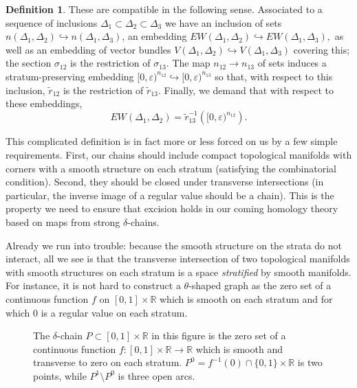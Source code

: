 \documentclass[10pt,a4paper]{amsart}
\theoremstyle{definition}
\newtheorem{definition}[theorem]{Definition}
\theoremstyle{remark}
\numberwithin{figure}{qchap}
\begin{document}
\begin{definition}
These are compatible in the following sense. Associated to a sequence of inclusions $\Delta_1 \subset \Delta_2 \subset \Delta_3$ we have an inclusion of sets $n(\Delta_1, \Delta_2) \hookrightarrow n(\Delta_1, \Delta_3)$, an embedding $EW(\Delta_1, \Delta_2) \hookrightarrow EW(\Delta_1, \Delta_3),$ as well as an embedding of vector bundles $V(\Delta_1, \Delta_2) \hookrightarrow V(\Delta_1, \Delta_3)$ covering this; the section $\sigma_{12}$ is the restriction of $\sigma_{13}$. The map $n_{12} \to n_{13}$ of sets induces a stratum-preserving embedding $[0,\varepsilon)^{n_{12}} \hookrightarrow [0,\varepsilon)^{n_{13}}$ so that, with respect to this inclusion, $\tilde r_{12}$ is the restriction of $\tilde r_{13}$. Finally, we demand that with respect to these embeddings, $$EW(\Delta_1, \Delta_2) = \tilde r_{13}^{-1}\left([0,\varepsilon)^{n_{12}}\right).$$
\end{definition}

This complicated definition is in fact more or less forced on us by a few simple requirements. First, our chains should include compact topological manifolds with corners with a smooth structure on each stratum (satisfying the combinatorial condition). Second, they should be closed under transverse intersections (in particular, the inverse image of a regular value should be a chain). This is the property we need to ensure that excision holds in our coming homology theory based on maps from strong $\delta$-chains.

Already we run into trouble: because the smooth structure on the strata do not interact, all we see is that the transverse intersection of two topological manifolds with smooth structures on each stratum is a space \textit{stratified} by smooth manifolds. For instance, it is not hard to construct a $\theta$-shaped graph as the zero set of a continuous function $f$ on $[0,1] \times \mathbb R$ which is smooth on each stratum and for which $0$ is a regular value on each stratum. 

\begin{figure}[h]
    \centering
    
    \caption{The $\delta$-chain $P \subset [0,1] \times \mathbb R$ in this figure is the zero set of a continuous function $f: [0,1] \times \mathbb R \to \mathbb R$ which is smooth and transverse to zero on each stratum. $P^0 = f^{-1}(0) \cap \{0,1\} \times \mathbb R$ is two points, while $P^1 \setminus P^0$ is three open arcs.}
    \label{fig:1}
\end{figure}
\end{document}
